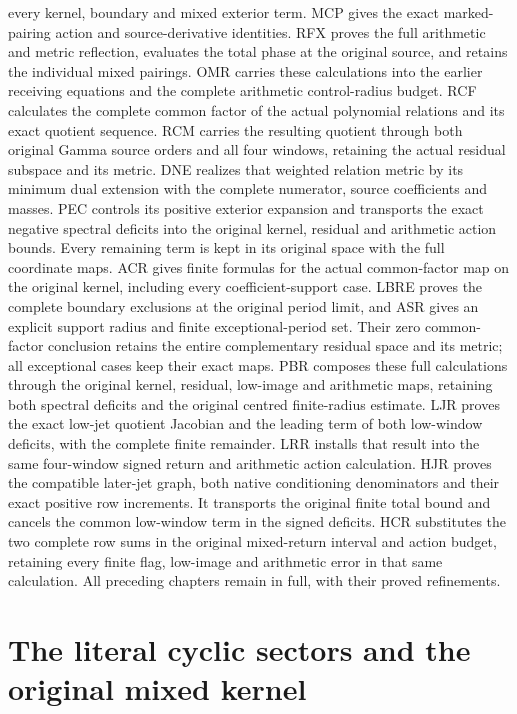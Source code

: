 \documentclass[11pt,a4paper]{article}
\begin{document}
every kernel, boundary and mixed exterior term. MCP gives the exact
marked-pairing action and source-derivative identities. RFX proves the
full arithmetic and metric reflection, evaluates the total phase at
the original source, and retains the individual mixed pairings.
OMR carries these calculations into the earlier receiving equations
and the complete arithmetic control-radius budget.
RCF calculates the complete common factor of the actual polynomial
relations and its exact quotient sequence. RCM carries the resulting
quotient through both original Gamma source orders and all four windows,
retaining the actual residual subspace and its metric.
DNE realizes that weighted relation metric by its minimum dual
extension with the complete numerator, source coefficients and masses.
PEC controls its positive exterior expansion and transports the exact
negative spectral deficits into the original kernel, residual and
arithmetic action bounds. Every remaining term is kept in its original
space with the full coordinate maps.
ACR gives finite formulas for the actual common-factor map on the
original kernel, including every coefficient-support case. LBRE proves
the complete boundary exclusions at the original period limit, and ASR
gives an explicit support radius and finite exceptional-period set.
Their zero common-factor conclusion retains the entire complementary
residual space and its metric; all exceptional cases keep their exact maps.
PBR composes these full calculations through the original kernel, residual,
low-image and arithmetic maps, retaining both spectral deficits and the
original centred finite-radius estimate. LJR proves the exact low-jet
quotient Jacobian and the leading term of both low-window deficits, with
the complete finite remainder. LRR installs that result into the same
four-window signed return and arithmetic action calculation. HJR proves
the compatible later-jet graph, both native conditioning denominators and
their exact positive row increments. It transports the original finite
total bound and cancels the common low-window term in the signed deficits.
HCR substitutes the two complete row sums in the original mixed-return
interval and action budget, retaining every finite flag, low-image and
arithmetic error in that same calculation.
All preceding chapters remain in full, with their proved refinements.
\tableofcontents
\clearpage

\clearpage
\section{The literal cyclic sectors and the original mixed kernel}
\label{sec:OCS}
\end{document}
